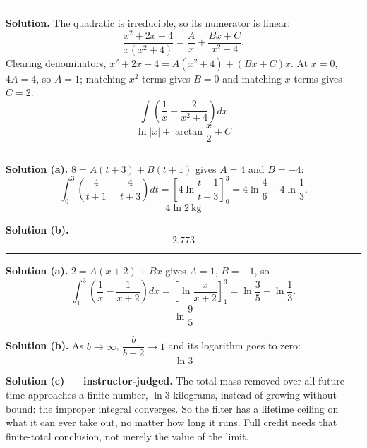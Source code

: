 \documentclass[12pt]{article}
\begin{document}
\vspace{0.15cm}\noindent\rule{\linewidth}{0.2pt}


\textbf{Solution.} The quadratic is irreducible, so its numerator is linear:
\[ \frac{x^2+2x+4}{x(x^2+4)} = \frac{A}{x} + \frac{Bx + C}{x^2+4}. \]
Clearing denominators, $x^2 + 2x + 4 = A(x^2+4) + (Bx + C)x$. At $x = 0$,
$4A = 4$, so $A = 1$; matching $x^2$ terms gives $B = 0$ and matching $x$ terms
gives $C = 2$.
\[ \int\left(\frac{1}{x} + \frac{2}{x^2+4}\right)dx \]
\[ \boxed{\ln|x| + \arctan\frac{x}{2} + C} \]

\vspace{0.15cm}\noindent\rule{\linewidth}{0.2pt}


\textbf{Solution (a).} $8 = A(t+3) + B(t+1)$ gives $A = 4$ and $B = -4$:
\[ \int_0^3\left(\frac{4}{t+1} - \frac{4}{t+3}\right)dt
   = \left[4\ln\frac{t+1}{t+3}\right]_0^3
   = 4\ln\frac{4}{6} - 4\ln\frac{1}{3}. \]
\[ \boxed{4\ln 2\ \text{kg}} \]

\textbf{Solution (b).}
\[ \boxed{2.773} \]

\vspace{0.15cm}\noindent\rule{\linewidth}{0.2pt}


\textbf{Solution (a).} $2 = A(x+2) + Bx$ gives $A = 1$, $B = -1$, so
\[ \int_1^3\left(\frac{1}{x} - \frac{1}{x+2}\right)dx
   = \left[\ln\frac{x}{x+2}\right]_1^3 = \ln\frac{3}{5} - \ln\frac{1}{3}. \]
\[ \boxed{\ln\frac{9}{5}} \]

\textbf{Solution (b).} As $b \rightarrow \infty$, $\dfrac{b}{b+2}\rightarrow 1$
and its logarithm goes to zero:
\[ \boxed{\ln 3} \]

\textbf{Solution (c) --- instructor-judged.} The total mass removed over all
future time approaches a finite number, $\ln 3$ kilograms, instead of growing
without bound: the improper integral converges. So the filter has a lifetime
ceiling on what it can ever take out, no matter how long it runs. Full credit
needs that finite-total conclusion, not merely the value of the limit.
\end{document}
